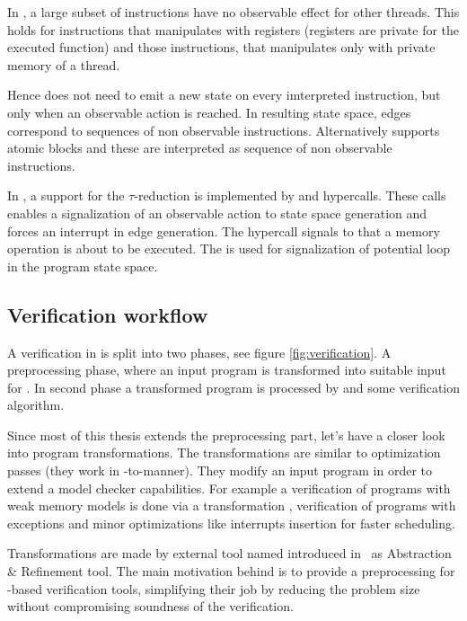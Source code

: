 In \LLVM, a large subset of instructions have no observable effect for other
threads. This holds for instructions that manipulates with registers (registers
are private for the executed function) and those instructions, that manipulates
only with private memory of a thread.

Hence \DIVINE does not need to emit a new state on every imterpreted
instruction, but only when an observable action is reached. In resulting state
space, edges correspond to sequences of non observable instructions.
Alternatively \DIVINE supports atomic blocks and these are interpreted as sequence
of non observable instructions.

In \DIVM, a support for the $\tau$-reduction is implemented by 
and  hypercalls. These calls enables a signalization of an
observable action to state space generation and forces an interrupt in edge
generation. The  hypercall signals to \DIVM that a memory
operation is about to be executed. The  is used for signalization
of potential loop in the program state space.

\subsection{Verification workflow}

A verification in \DIVINE is split into two phases, see figure
\autoref{fig:verification}. A preprocessing phase, where an input program is
transformed into suitable input for \DIVM. In second phase a transformed program
is processed by \DIVM and some verification algorithm.

Since most of this thesis extends the preprocessing part, let's have a closer
look into program transformations. The transformations are similar to \LLVM
optimization passes (they work in \LLVM -to-\LLVM manner). They modify an input
program in order to extend a model checker capabilities. For example a
verification of programs with weak memory models is done via a transformation
\cite{Still16}, verification of programs with exceptions \cite{Still17} and minor
optimizations like interrupts insertion for faster scheduling.

Transformations are made by external tool named \LART introduced in~\cite{Rockai15}
as \LLVM Abstraction \& Refinement tool. The main motivation behind \LART is to
provide a preprocessing for \LLVM -based verification tools, simplifying their
job by reducing the problem size without compromising soundness of the
verification.

